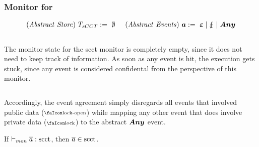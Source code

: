 \documentclass[utf8,acmsmall,review,screen,dvipsnames,anonymous]{acmart}
\begin{document}
\subsubsection{Monitor for }
\begin{gather*}
  \begin{aligned}
    \mathit{(Abstract\ Store)}~T_{sCCT}{}&:=\ \emptyset \hspace{0.5cm}
    \mathit{(Abstract\ Events)}~\bm{a}:=\ \bm{\varepsilon} \mid \lightning{\kern-5.5pt}\lightning \mid \bm{Any} \\
  \end{aligned}
\end{gather*}
\begin{center}
  $\;$\\
\end{center}
The monitor state for the \gls{scct} monitor is completely empty, since it does not need to keep track of information.
As soon as any event is hit, the execution gets stuck, since any event is considered confidental from the perspective of this monitor.
\begin{center}
  $\;$\\
\end{center}
Accordingly, the event agreement simply disregards all events that involved public data ($\unlock$) while mapping any other event that does involve private data ($\lock$) to the abstract $\bm{Any}$ event.

\begin{lemma}\label{lem:mon:scctsafe}
  If $\vdash_{mon}{\overline{a}}:{\operatorname{scct}}$, then $\overline{a}\in\operatorname{scct}$. %
\end{lemma}
\end{document}
